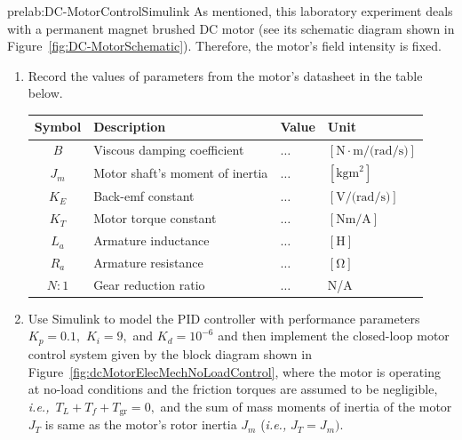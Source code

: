 \begin{prelab}{prelab:DC-MotorControlSimulink}
As mentioned, this laboratory experiment deals with a permanent magnet brushed DC motor (see its schematic diagram shown in Figure~\ref{fig:DC-MotorSchematic}). Therefore, the motor's field intensity is fixed. 
%
\begin{enumerate}
\item Record the values of parameters from the motor's datasheet in the table below.

  \begin{center}
    \begin{tabular}{c|l|l|l}
      \toprule
      Symbol & Description & Value & Unit\\
      \toprule
      $B$&Viscous damping coefficient&$\ldots$&$[\si{\newton\cdot\meter\per(\radian\per\second)}]$\\
      $J_m$&Motor shaft's moment of inertia&$\ldots$&$[\si{\kilogram\meter}^2]$\\      
      $K_E$&Back-emf constant &$\ldots$&$[\si{\volt\per(\radian\per\second)}]$\\
      $K_T$&Motor torque constant &$\ldots$&$[\si{\newton\meter\per\ampere}]$\\
      $L_a$&Armature inductance &$\ldots$&$[\si{\henry}]$\\            
      $R_a$&Armature resistance &$\ldots$&$[\si{\ohm}]$\\
      $N:1$&Gear reduction ratio &$\ldots$&N/A\\      
      \bottomrule
    \end{tabular}    
  \end{center}
\item  Use Simulink to model the PID controller with performance parameters $K_p = 0.1,$ $K_i = 9,$ and $K_d = 10^{-6}$ and then implement the closed-loop motor control system given by the block diagram shown in Figure~\ref{fig:dcMotorElecMechNoLoadControl}, where the motor is operating at no-load conditions and the friction torques are assumed to be negligible, \textit{i.e.,~}$T_L + T_f +T_{\mathrm{gr}} = 0,$ and the sum of mass moments of inertia of the motor $J_T$ is same as the motor's rotor inertia $J_m$ (\textit{i.e.,} $J_T=J_m).$
  

\end{enumerate}
\end{prelab}
